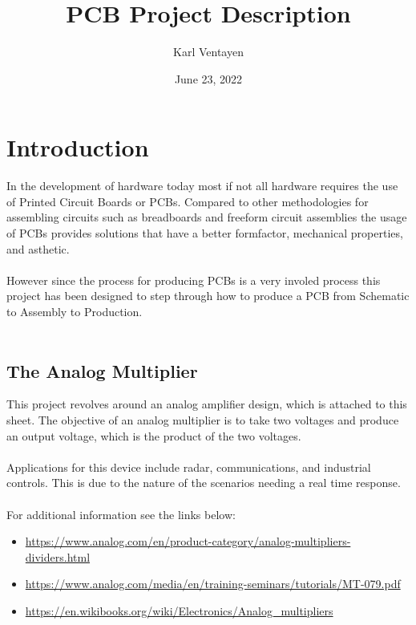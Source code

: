 \documentclass[12pt, letterpaper]{article}
\title{PCB Project Description}
\author{Karl Ventayen}
\date{June 23, 2022}
\begin{document}
\begin{comment}
\begin{titlepage}
    \maketitle
\end{titlepage}
\end{comment}

\maketitle

\tableofcontents{}

\section{Introduction}
In the development of hardware today most if not all hardware requires the use of Printed Circuit Boards or PCBs. Compared to other methodologies for assembling circuits such as breadboards and freeform circuit assemblies the usage of PCBs provides solutions that have a better formfactor, mechanical properties, and asthetic.\\
\\
However since the process for producing PCBs is a very involed process this project has been designed to step through how to produce a PCB from Schematic to Assembly to Production.
\\
\\
\subsection{The Analog Multiplier}
This project revolves around an analog amplifier design, which is attached to this sheet. The objective of an analog multiplier is to take two voltages and produce an output voltage, which is the product of the two voltages.
\\
\\
Applications for this device include radar, communications, and industrial controls. This is due to the nature of the scenarios needing a real time response.
\\
\\
For additional information see the links below:
\begin{itemize}
    \item \url{https://www.analog.com/en/product-category/analog-multipliers-dividers.html}
    \item \url{https://www.analog.com/media/en/training-seminars/tutorials/MT-079.pdf}
    \item \url{https://en.wikibooks.org/wiki/Electronics/Analog_multipliers}
\end{itemize}
\end{document}
